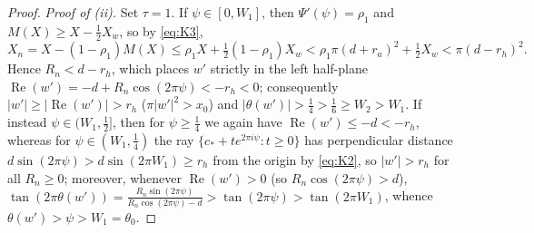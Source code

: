 \begin{proof}
\emph{Proof of (ii).} Set $\tau=1$. If $\psi\in[0,W_1]$, then $\Psi'(\psi)=\rho_1$ and $M(X)\ge X-\frac12X_w$, so by
\eqref{eq:K3},
\[
 X_n = X - (1-\rho_1)M(X) \le \rho_1 X + \tfrac12(1-\rho_1)X_w
 < \rho_1\pi(d+r_a)^2 + \tfrac12X_w < \pi(d-r_h)^2.
\]
Hence $R_n<d-r_h$, which places $w'$ strictly in the left half-plane $\operatorname{Re}(w')=-d+R_n\cos(2\pi\psi)<-r_h<0$;
consequently $|w'|\ge|\operatorname{Re}(w')|>r_h$ ($\pi|w'|^2>x_0$) and $|\theta(w')|>\frac14>\frac16\ge W_2>W_1$.
If instead $\psi\in(W_1,\frac12]$, then for $\psi\ge\frac14$ we again have $\operatorname{Re}(w')\le-d<-r_h$, whereas
for $\psi\in(W_1,\frac14)$ the ray $\{c_*+te^{2\pi i\psi}:t\ge0\}$ has perpendicular distance $d\sin(2\pi\psi)>d\sin(2\pi W_1)\ge r_h$
from the origin by \eqref{eq:K2}, so $|w'|>r_h$ for all $R_n\ge0$; moreover, whenever $\operatorname{Re}(w')>0$ (so
$R_n\cos(2\pi\psi)>d$), $\tan(2\pi\theta(w'))=\frac{R_n\sin(2\pi\psi)}{R_n\cos(2\pi\psi)-d}>\tan(2\pi\psi)>\tan(2\pi W_1)$,
whence $\theta(w')>\psi>W_1=\theta_0$.
\end{proof}
